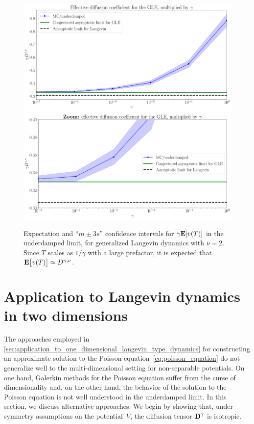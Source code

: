 \documentclass[11pt,a4paper]{article}
\begin{document}
\begin{figure}[ht]
    \centering
    \includegraphics[width=0.9\linewidth]{figures/mobility_gle.pdf}
    \includegraphics[width=0.9\linewidth]{figures/mobility_gle_zoom.pdf}
    \caption{%
        Expectation and ``$m \pm 3 s$'' confidence intervals for $\gamma \mathbf{E} [v(T)]$ in the underdamped limit,
        for generalized Langevin dynamics with $\nu = 2$.
        Since $T$ scales as $1/\gamma$ with a large prefactor,
        it is expected that $\mathbf{E} \bigl[ v(T) \bigr] \approx D^{\gamma,\nu}$.
    }
    \label{fig:effective_diffusion_gle}
\end{figure}


\section{Application to Langevin dynamics in two dimensions}%
\label{sec:applications_2d}%
The approaches employed in \cref{sec:application_to_one_dimensional_langevin_type_dynamics} for constructing an approximate solution to the Poisson equation~\eqref{eq:poisson_equation}
do not generalize well to the multi-dimensional setting for non-separable potentials.
On one hand, Galerkin methods for the Poisson equation suffer from the curse of dimensionality and,
on the other hand, the behavior of the solution to the Poisson equation is not well understood in the underdamped limit.
In this section, we discuss alternative approaches.
We begin by showing that,
under symmetry assumptions on the potential~$V$,
the diffusion tensor $\boldsymbol{\mathbf D}^{\gamma}$ is isotropic.
\end{document}
